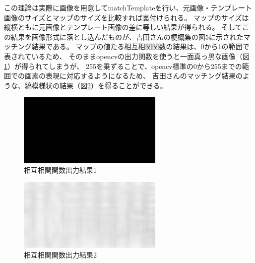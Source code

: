 \documentclass{jsarticle}
\begin{document}
\begin{multicols}{2}
この理論は実際に画像を用意してmatchTemplateを行い、元画像・テンプレート画像のサイズとマップのサイズを比較すれば裏付けられる。
マップのサイズは縦横ともに元画像とテンプレート画像の差に等しい結果が得られる。
そしてこの結果を画像形式に落とし込んだものが、吉田さんの梗概集の図5に示されたマッチング結果である。
マップの値たる相互相関関数の結果は、0から1の範囲で表されているため、
そのままopencvの出力関数を使うと一面真っ黒な画像（図\ref{fig:res}）が得られてしまうが、
255を乗ずることで、opencv標準の0から255までの範囲での画素の表現に対応するようになるため、
吉田さんのマッチング結果のような、縞模様状の結果（図\ref{fig:res2}）を得ることができる。

\begin{figure}[H]
  \begin{center}
    \includegraphics[clip,width=7.0cm]{./img/res.png}
    \caption{相互相関関数出力結果1}
    \label{fig:res}
  \end{center}
\end{figure}

\begin{figure}[H]
  \begin{center}
    \includegraphics[clip,width=7.0cm]{./img/res2.png}
    \caption{相互相関関数出力結果2}
    \label{fig:res2}
  \end{center}
\end{figure}

%

\end{multicols}

\newpage
\end{document}
